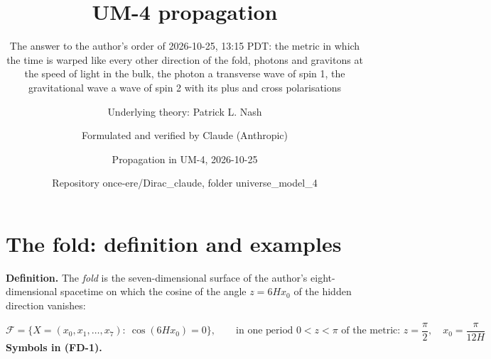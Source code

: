\documentclass[
  10pt,
]{article}
\title{UM-4 propagation}
\subtitle{The answer to the author's order of 2026-10-25, 13:15 PDT: the
metric in which the time is warped like every other direction of the
fold, photons and gravitons at the speed of light in the bulk, the
photon a transverse wave of spin 1, the gravitational wave a wave of
spin 2 with its plus and cross polarisations}
\author{Underlying theory: Patrick L. Nash \and Formulated and verified
by Claude (Anthropic) \and Propagation in UM-4,
2026-10-25 \and Repository once-ere/Dirac\_claude, folder
universe\_model\_4}
\date{}
\begin{document}
\maketitle

{
\hypersetup{linkcolor=}
\setcounter{tocdepth}{3}
\tableofcontents
}
\hypertarget{the-fold-definition-and-examples}{%
\section{The fold: definition and
examples}\label{the-fold-definition-and-examples}}

\textbf{Definition.} The \emph{fold} is the seven-dimensional surface of
the author's eight-dimensional spacetime on which the cosine of the
angle \(z = 6Hx_0\) of the hidden direction vanishes:

\[
\mathcal{F} = \big\{X = (x_0, x_1, \dots, x_7):\ \cos(6Hx_0) = 0\big\},\qquad
\text{in one period } 0 < z < \pi\text{ of the metric: } z = \frac{\pi}{2},\quad x_0 = \frac{\pi}{12H} \tag{FD-1}
\] \textbf{Symbols in (FD-1).}
\end{document}

